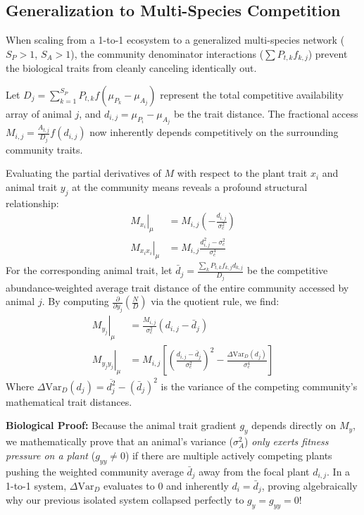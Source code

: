 \documentclass{article}
\begin{document}
\subsection*{Generalization to Multi-Species Competition}
When scaling from a 1-to-1 ecosystem to a generalized multi-species network ($S_P > 1$, $S_A > 1$), the community denominator interactions ($\sum P_{t,k} f_{k,j}$) prevent the biological traits from cleanly canceling identically out. 

Let $D_j = \sum_{k=1}^{S_P} P_{t,k} f(\mu_{P_k} - \mu_{A_j})$ represent the total competitive availability array of animal $j$, and $d_{i,j} = \mu_{P_i} - \mu_{A_j}$ be the trait distance. The fractional access $M_{i,j} = \frac{A_{t,j}}{D_j} f(d_{i,j})$ now inherently depends competitively on the surrounding community traits.

Evaluating the partial derivatives of $M$ with respect to the plant trait $x_i$ and animal trait $y_j$ at the community means reveals a profound structural relationship:
\begin{align}
    \left. M_{x_i} \right|_{\mu} &= M_{i,j} \left( -\frac{d_{i,j}}{\sigma_c^2} \right) \\
    \left. M_{x_i x_i} \right|_{\mu} &= M_{i,j} \frac{d_{i,j}^2 - \sigma_c^2}{\sigma_c^4} 
\end{align}
For the corresponding animal trait, let $\bar{d}_j = \frac{\sum_k P_{t,k} f_{k,j} d_{k,j}}{D_j}$ be the competitive abundance-weighted average trait distance of the entire community accessed by animal $j$. By computing $\frac{\partial}{\partial y_j} (\frac{N}{D})$ via the quotient rule, we find:
\begin{align}
    \left. M_{y_j} \right|_{\mu} &= \frac{M_{i,j}}{\sigma_c^2} \left( d_{i,j} - \bar{d}_j \right) \\
    \left. M_{y_j y_j} \right|_{\mu} &= M_{i,j} \left[ \left(\frac{d_{i,j} - \bar{d}_j}{\sigma_c^2}\right)^2 - \frac{\Delta \text{Var}_D(d_j)}{\sigma_c^4} \right]
\end{align}
Where $\Delta \text{Var}_D(d_j) = \overline{d_{j}^2} - (\bar{d}_j)^2$ is the variance of the competing community's mathematical trait distances.

\textbf{Biological Proof:} Because the animal trait gradient $g_y$ depends directly on $M_y$, we mathematically prove that an animal's variance ($\sigma_A^2$) \textit{only exerts fitness pressure on a plant} ($g_{yy} \neq 0$) if there are multiple actively competing plants pushing the weighted community average $\bar{d}_j$ away from the focal plant $d_{i,j}$. In a 1-to-1 system, $\Delta \text{Var}_D$ evaluates to 0 and inherently $d_i = \bar{d}_j$, proving algebraically why our previous isolated system collapsed perfectly to $g_y = g_{yy} = 0$!
\end{document}
